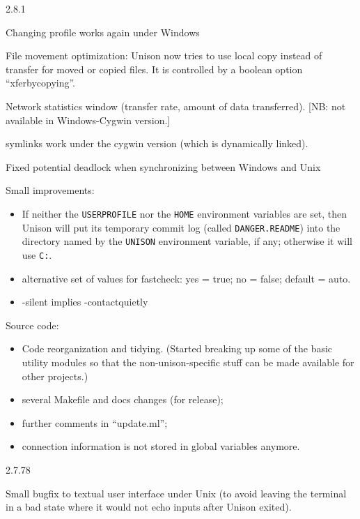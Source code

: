\begin{changesfromversion}{2.8.1}
\item Changing profile works again under Windows
\item File movement optimization: Unison now tries to use local copy instead of
  transfer for moved or copied files.  It is controlled by a boolean option
  ``xferbycopying''.
\item Network statistics window (transfer rate, amount of data transferred).
      [NB: not available in Windows-Cygwin version.]
\item symlinks work under the cygwin version (which is dynamically linked).
\item Fixed potential deadlock when synchronizing between Windows and
Unix
\item Small improvements:
  \begin{itemize}
  \item If neither the {\tt USERPROFILE} nor the {\tt HOME} environment
    variables are set, then Unison will put its temporary commit log
    (called {\tt DANGER.README}) into the directory named by the
    {\tt UNISON} environment variable, if any; otherwise it will use
    {\tt C:}.
  \item alternative set of values for fastcheck: yes = true; no = false;
  default = auto.
  \item -silent implies -contactquietly
  \end{itemize}
\item Source code:
  \begin{itemize}
  \item Code reorganization and tidying.  (Started breaking up some of the
    basic utility modules so that the non-unison-specific stuff can be
    made available for other projects.)
  \item several Makefile and docs changes (for release);
  \item further comments in ``update.ml'';
  \item connection information is not stored in global variables anymore.
  \end{itemize}
\end{changesfromversion}

\begin{changesfromversion}{2.7.78}
\item Small bugfix to textual user interface under Unix (to avoid leaving
  the terminal in a bad state where it would not echo inputs after Unison
  exited).
\end{changesfromversion}

